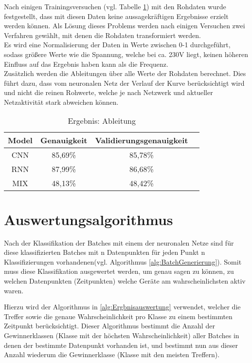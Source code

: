     \noindent
    Nach einigen Trainingsversuchen (vgl. Tabelle \ref{tabl:ErgebnisAbleitung}) mit den Rohdaten wurde festgestellt, dass mit diesen Daten keine aussagekräftigen Ergebnisse erzielt werden können.
    Als Lösung dieses Problems werden nach einigen Versuchen zwei Verfahren gewählt, mit denen die Rohdaten transformiert werden. \\
    \noindent
    Es wird eine Normalisierung der Daten in Werte zwischen 0-1 durchgeführt, sodass größere Werte wie die Spannung, welche bei ca. 230V liegt, keinen höheren Einfluss auf das Ergebnis haben kann als die Frequenz.\\
    \noindent
    Zusätzlich werden die Ableitungen über alle Werte der Rohdaten berechnet.
    Dies führt dazu, dass vom neuronalen Netz der Verlauf der Kurve berücksichtigt wird und nicht die reinen Rohwerte, welche je nach Netzwerk und aktueller Netzaktivität stark abweichen können.

    \begin{table}[H]
        \centering
        \begin{tabular}{|c|c|c|c|}
            \hline
            Model & Genauigkeit & Validierungsgenauigkeit \\
            \hline
            CNN & 85,69\% & 85,78\% \\
            \hline
            RNN & 87,99\% & 86,68\% \\
            \hline
            MIX & 48,13\% & 48,42\% \\
            \hline
        \end{tabular}
        \caption{Ergebnis: Ableitung}
        \label{tabl:ErgebnisAbleitung}
    \end{table}

    \section{Auswertungsalgorithmus}\label{Auswertungsalgorithmus}
        Nach der Klassifikation der Batches mit einem der neuronalen Netze sind für diese klassifizierten Batches mit n Datenpunkten für jeden Punkt n Klassifizierungen vorhandenen(vgl. Algorithmus \ref{alg:BatchGenerierung}).
        Somit muss diese Klassifikation ausgewertet werden, um genau sagen zu können, zu welchen Datenpunkten (Zeitpunkten) welche Geräte am wahrscheinlichsten aktiv waren.
        \newline
        
        Hierzu wird der Algorithmus in \ref{alg:Ergbnisauswertung} verwendet, welcher die Treffer sowie die genaue Wahrscheinlichkeit pro Klasse zu einem bestimmten Zeitpunkt berücksichtigt. 
        Dieser Algorithmus bestimmt die Anzahl der Gewinnerklassen (Klasse mit der höchsten Wahrscheinlichkeit) aller Batches in denen der bestimmte Datenpunkt vorhanden ist, und bestimmt nun aus dieser Anzahl wiederum die Gewinnerklasse (Klasse mit den meisten Treffern).
        
